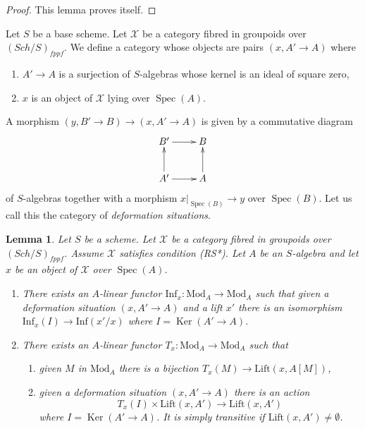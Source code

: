 \documentclass{stacks-project}
\theoremstyle{plain}
\newtheorem{lemma}[subsection]{Lemma}
\theoremstyle{definition}
\theoremstyle{remark}
\numberwithin{equation}{subsection}
\def\Spec{\mathop{\mathrm{Spec}}}
\def\Sch{\mathit{Sch}}
\def\Ker{\mathop{\mathrm{Ker}}}
\begin{document}
\begin{proof}
This lemma proves itself.
\end{proof}

\noindent
Let $S$ be a base scheme. Let $\mathcal{X}$ be a category fibred
in groupoids over $(\Sch/S)_{fppf}$. We define a category whose objects are
pairs $(x, A' \to A)$ where
\begin{enumerate}
\item $A' \to A$ is a surjection of $S$-algebras whose kernel
is an ideal of square zero,
\item $x$ is an object of $\mathcal{X}$ lying over $\Spec(A)$.
\end{enumerate}
A morphism $(y, B' \to B) \to (x, A' \to A)$ is given by a commutative
diagram
$$
\xymatrix{
B' \ar[r] & B \\
A' \ar[u] \ar[r] & A \ar[u]
}
$$
of $S$-algebras together with a morphism $x|_{\Spec(B)} \to y$ over
$\Spec(B)$. Let us call this the category of {\it deformation situations}.

\begin{lemma}
\label{lemma-properties-lift-RS-star}
Let $S$ be a scheme. Let $\mathcal{X}$ be a category
fibred in groupoids over $(\Sch/S)_{fppf}$. Assume $\mathcal{X}$ satisfies
condition (RS*). Let $A$ be an $S$-algebra and let $x$ be an object of
$\mathcal{X}$ over $\Spec(A)$.
\begin{enumerate}
\item There exists an $A$-linear functor
$\text{Inf}_x : \text{Mod}_A \to \text{Mod}_A$
such that given a deformation situation $(x, A' \to A)$ and a lift $x'$
there is an isomorphism $\text{Inf}_x(I) \to \text{Inf}(x'/x)$ where
$I = \Ker(A' \to A)$.
\item There exists an $A$-linear functor
$T_x : \text{Mod}_A \to \text{Mod}_A$
such that
\begin{enumerate}
\item given $M$ in $\text{Mod}_A$ there is a bijection
$T_x(M) \to \text{Lift}(x, A[M])$,
\item given a deformation situation $(x, A' \to A)$ there is an action
$$
T_x(I) \times \text{Lift}(x, A') \to \text{Lift}(x, A')
$$
where $I = \Ker(A' \to A)$. It is simply transitive if
$\text{Lift}(x, A') \not = \emptyset$.
\end{enumerate}
\end{enumerate}
\end{lemma}
\end{document}
